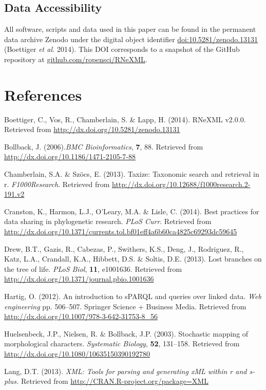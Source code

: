 \documentclass[author-year, review, 11pt]{components/elsarticle} %
\begin{document}
\subsection{Data Accessibility}\label{data-accessibility}

All software, scripts and data used in this paper can be found in the
permanent data archive Zenodo under the digital object identifier
\url{doi:10.5281/zenodo.13131} (Boettiger \emph{et al.} 2014). This DOI
corresponds to a snapshot of the GitHub repository at
\href{https://github.com/ropensci/RNeXML}{github.com/ropensci/RNeXML}.

\section*{References}\label{references}

Boettiger, C., Vos, R., Chamberlain, S. \& Lapp, H. (2014). RNeXML
v2.0.0. Retrieved from \url{http://dx.doi.org/10.5281/zenodo.13131}

Bollback, J. (2006).\emph{BMC Bioinformatics}, \textbf{7}, 88. Retrieved
from \url{http://dx.doi.org/10.1186/1471-2105-7-88}

Chamberlain, S.A. \& Sz{ö}cs, E. (2013). Taxize: Taxonomic search and
retrieval in r. \emph{F1000Research}. Retrieved from
\url{http://dx.doi.org/10.12688/f1000research.2-191.v2}

Cranston, K., Harmon, L.J., O'Leary, M.A. \& Lisle, C. (2014). Best
practices for data sharing in phylogenetic research. \emph{PLoS Curr}.
Retrieved from
\url{http://dx.doi.org/10.1371/currents.tol.bf01eff4a6b60ca4825c69293dc59645}

Drew, B.T., Gazis, R., Cabezas, P., Swithers, K.S., Deng, J., Rodriguez,
R., Katz, L.A., Crandall, K.A., Hibbett, D.S. \& Soltis, D.E. (2013).
Lost branches on the tree of life. \emph{PLoS Biol}, \textbf{11},
e1001636. Retrieved from
\url{http://dx.doi.org/10.1371/journal.pbio.1001636}

Hartig, O. (2012). An introduction to sPARQL and queries over linked
data. \emph{Web engineering} pp. 506--507. Springer Science + Business
Media. Retrieved from
\url{http://dx.doi.org/10.1007/978-3-642-31753-8_56}

Huelsenbeck, J.P., Nielsen, R. \& Bollback, J.P. (2003). Stochastic
mapping of morphological characters. \emph{Systematic Biology},
\textbf{52}, 131--158. Retrieved from
\url{http://dx.doi.org/10.1080/10635150390192780}

Lang, D.T. (2013). \emph{XML: Tools for parsing and generating xML
within r and s-plus.} Retrieved from
\url{http://CRAN.R-project.org/package=XML}
\end{document}
